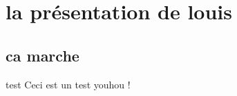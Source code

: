 \section{la présentation de louis}
\subsection{ca marche}
\begin{frame}{test}
Ceci est un test youhou !

\end{frame}